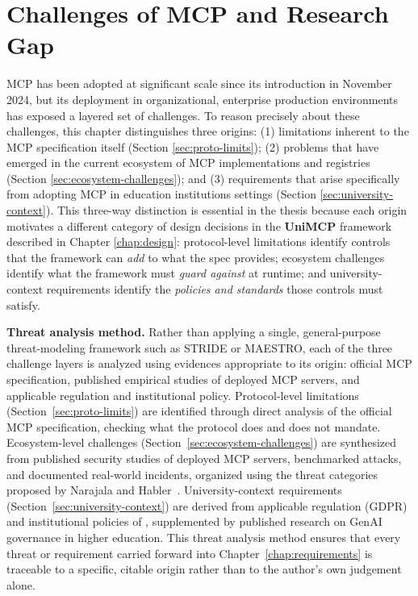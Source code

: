 \documentclass[english, 12pt, a4paper, elec, utf8, a-2b, online]{aaltothesis}
\newcommand{\UniMCP}{\textbf{UniMCP}\xspace}
\newcommand{\aalto}{\text{Aalto University}\xspace}
\begin{document}
\section{Challenges of MCP and Research Gap}
\label{chap:challenges}

MCP has been adopted at significant scale since its introduction in November 2024, but its deployment in organizational, enterprise production environments has exposed a layered set of challenges.
To reason precisely about these challenges, this chapter distinguishes three origins: (1) limitations inherent to the MCP specification itself (Section \ref{sec:proto-limits});
(2) problems that have emerged in the current ecosystem of MCP implementations and registries (Section \ref{sec:ecosystem-challenges}); and 
(3) requirements that arise specifically from adopting MCP in education institutions settings (Section \ref{sec:university-context}).
This three-way distinction is essential in the thesis because each origin motivates a different category of design decisions in the \UniMCP framework described in Chapter \ref{chap:design}: 
protocol-level limitations identify controls that the framework can \emph{add} to what the spec provides; 
ecosystem challenges identify what the framework must \emph{guard against} at runtime; and
university-context requirements identify the \emph{policies and standards} those controls must satisfy.

\textbf{Threat analysis method.} Rather than applying a single, general-purpose threat-modeling framework such as STRIDE or MAESTRO, each of the three challenge layers is analyzed using evidences appropriate to its origin: official MCP specification, published empirical studies of deployed MCP servers, and applicable regulation and institutional policy.
Protocol-level limitations (Section~\ref{sec:proto-limits}) are identified through direct analysis of the official MCP specification, checking what the protocol does and does not mandate. 
Ecosystem-level challenges (Section~\ref{sec:ecosystem-challenges}) are synthesized from published security studies of deployed MCP servers, benchmarked attacks, and documented real-world incidents, organized using the threat categories proposed by Narajala and Habler~\cite{narajala2025enterprise}. 
University-context requirements (Section~\ref{sec:university-context}) are derived from applicable regulation (GDPR) and institutional policies of \aalto, supplemented by published research on GenAI governance in higher education. 
This threat analysis method ensures that every threat or requirement carried forward into Chapter~\ref{chap:requirements} is traceable to a specific, citable origin rather than to the author's own judgement alone.
\end{document}
